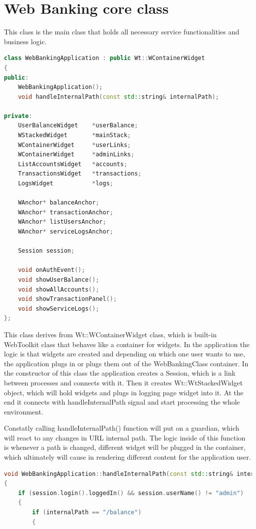 \documentclass[a4paper,12pt]{book}
\begin{document}
\section{Web Banking core class}
{
This class is the main class that holds all necessary service functionalities and business logic.  
\bigskip
\begin{lstlisting}[frame=single, basicstyle=\small, language=C++, caption={WebBankingApplication.cpp.}, captionpos=b]
class WebBankingApplication : public Wt::WContainerWidget
{
public:
	WebBankingApplication();
	void handleInternalPath(const std::string& internalPath);
	
private:
	UserBalanceWidget    *userBalance;
	WStackedWidget       *mainStack;
	WContainerWidget     *userLinks;
	WContainerWidget	 *adminLinks;
	ListAccountsWidget   *accounts;
	TransactionsWidget   *transactions;
	LogsWidget			 *logs;

	WAnchor* balanceAnchor;
	WAnchor* transactionAnchor;
	WAnchor* listUsersAnchor;
	WAnchor* serviceLogsAnchor;

	Session session;

	void onAuthEvent();
	void showUserBalance();
	void showAllAccounts();
	void showTransactionPanel();
	void showServiceLogs();
};
\end{lstlisting}

\bigskip
This class derives  from Wt::WContainerWidget class, which is built-in WebToolkit class that behaves like a container for widgets. In the application the logic is that widgets are created and depending on which one user wants to use, the application plugs in or plugs them out of the WebBankingClass container. In the constructor of this class the application creates a Session, which is a link between processes and connects with it. Then it creates Wt::WtStackedWidget object, which will hold widgets and plugs in logging page widget into it. At the end it connects with handleInternalPath signal and start processing the whole environment. 

\bigskip
Constatly calling handleInternalPath() function will put on a guardian, which will react to any changes in URL internal path. The logic inside of this function is whenever a path is changed, different widget will be plugged in the container, which ultimately will cause in rendering different content for the application user.

\bigskip
\begin{lstlisting}[frame=single, basicstyle=\small, language=C++, caption={handleInternalPath() function.}, captionpos=b]
void WebBankingApplication::handleInternalPath(const std::string& internalPath)
{
	if (session.login().loggedIn() && session.userName() != "admin") 
	{
		if (internalPath == "/balance")
		{


\end{lstlisting}}
\end{document}
